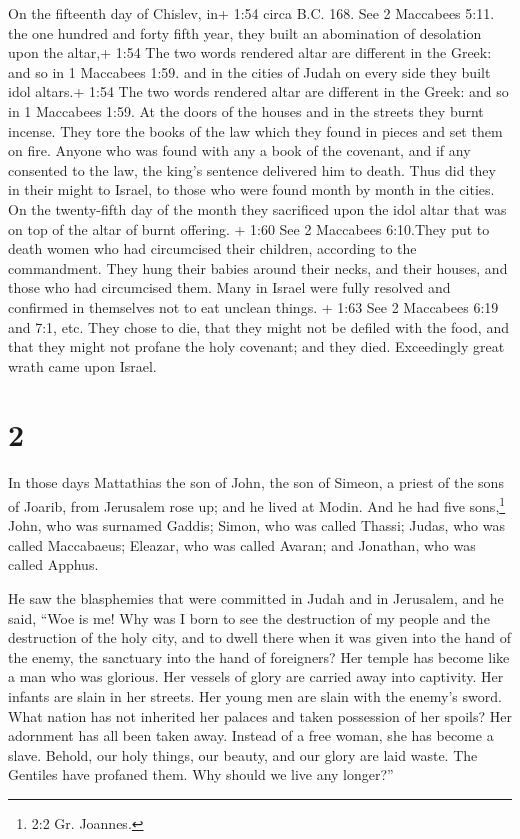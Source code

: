  On the fifteenth day of Chislev, in+ 1:54 circa B.C. 168.
See 2 Maccabees 5:11. the one hundred and forty fifth year, they built
an abomination of desolation upon the altar,+ 1:54 The two words
rendered altar are different in the Greek: and so in 1 Maccabees 1:59.
and in the cities of Judah on every side they built idol altars.+ 1:54
The two words rendered altar are different in the Greek: and so in 1
Maccabees 1:59.  At the doors of the houses and in the
streets they burnt incense.  They tore the books of the law
which they found in pieces and set them on fire.  Anyone
who was found with any a book of the covenant, and if any consented to
the law, the king's sentence delivered him to death.  Thus
did they in their might to Israel, to those who were found month by
month in the cities.  On the twenty-fifth day of the month
they sacrificed upon the idol altar that was on top of the altar of
burnt offering.  + 1:60 See 2 Maccabees 6:10.They put to
death women who had circumcised their children, according to the
commandment.  They hung their babies around their necks,
and their houses, and those who had circumcised them.  Many
in Israel were fully resolved and confirmed in themselves not to eat
unclean things.  + 1:63 See 2 Maccabees 6:19 and 7:1, etc.
They chose to die, that they might not be defiled with the food, and
that they might not profane the holy covenant; and they died.
 Exceedingly great wrath came upon Israel.

\hypertarget{section-1}{%
\section{2}\label{section-1}}

 In those days Mattathias the son of John, the son of
Simeon, a priest of the sons of Joarib, from Jerusalem rose up; and he
lived at Modin.  And he had five sons,\footnote{2:2 Gr.
  Joannes.} John, who was surnamed Gaddis;  Simon, who was
called Thassi;  Judas, who was called Maccabaeus;
 Eleazar, who was called Avaran; and Jonathan, who was
called Apphus.

 He saw the blasphemies that were committed in Judah and in
Jerusalem,  and he said, ``Woe is me! Why was I born to see
the destruction of my people and the destruction of the holy city, and
to dwell there when it was given into the hand of the enemy, the
sanctuary into the hand of foreigners?  Her temple has
become like a man who was glorious.  Her vessels of glory
are carried away into captivity. Her infants are slain in her streets.
Her young men are slain with the enemy's sword.  What
nation has not inherited her palaces and taken possession of her spoils?
 Her adornment has all been taken away. Instead of a free
woman, she has become a slave.  Behold, our holy things,
our beauty, and our glory are laid waste. The Gentiles have profaned
them.  Why should we live any longer?''

